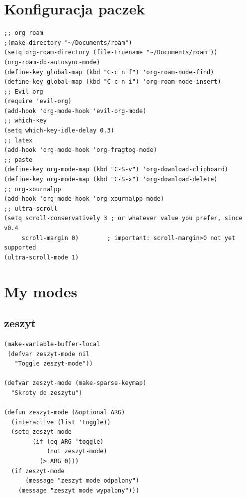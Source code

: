 \documentclass[11pt]{article}
\begin{document}
\section{Konfiguracja paczek}
\label{sec:orgd0fe222}
\begin{verbatim}
;; org roam
;(make-directory "~/Documents/roam")
(setq org-roam-directory (file-truename "~/Documents/roam"))
(org-roam-db-autosync-mode)
(define-key global-map (kbd "C-c n f") 'org-roam-node-find)
(define-key global-map (kbd "C-c n i") 'org-roam-node-insert)
;; Evil org
(require 'evil-org)
(add-hook 'org-mode-hook 'evil-org-mode)
;; which-key
(setq which-key-idle-delay 0.3)
;; latex
(add-hook 'org-mode-hook 'org-fragtog-mode)
;; paste
(define-key org-mode-map (kbd "C-S-v") 'org-download-clipboard)
(define-key org-mode-map (kbd "C-S-x") 'org-download-delete)
;; org-xournalpp
(add-hook 'org-mode-hook 'org-xournalpp-mode)
;; ultra-scroll
(setq scroll-conservatively 3 ; or whatever value you prefer, since v0.4
     scroll-margin 0)        ; important: scroll-margin>0 not yet supported
(ultra-scroll-mode 1)
\end{verbatim}
\section{My modes}
\label{sec:orgc689dd1}
\subsection{zeszyt}
\label{sec:orgc6f5bb2}
\begin{verbatim}
(make-variable-buffer-local
 (defvar zeszyt-mode nil
   "Toggle zeszyt-mode"))

(defvar zeszyt-mode (make-sparse-keymap)
  "Skroty do zeszytu")

(defun zeszyt-mode (&optional ARG)
  (interactive (list 'toggle))
  (setq zeszyt-mode
        (if (eq ARG 'toggle)
            (not zeszyt-mode)
          (> ARG 0)))
  (if zeszyt-mode
      (message "zeszyt mode odpalony")
    (message "zeszyt mode wypalony")))
\end{verbatim}
\end{document}
